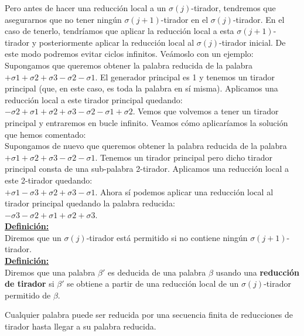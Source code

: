 \documentclass[14pt]{extarticle}
\begin{document}
Pero antes de hacer una reducción local a un $\sigma(j)$-tirador, tendremos que asegurarnos que no tener ningún $\sigma(j+1)$-tirador en el $\sigma(j)$-tirador. En el caso de tenerlo, tendríamos que aplicar la reducción local a esta $\sigma(j+1)$-tirador y posteriormente aplicar la reducción local al $\sigma(j)$-tirador inicial. De este modo podremos evitar ciclos infinitos. Veámoslo con un ejemplo:\\

Supongamos que queremos obtener la palabra reducida de la palabra $+\sigma1+\sigma2+\sigma3-\sigma2-\sigma1$. El generador principal es 1 y tenemos un tirador principal (que, en este caso, es toda la palabra en sí misma). Aplicamos una reducción local a este tirador principal quedando: \\
$-\sigma2+\sigma1+\sigma2+\sigma3-\sigma2-\sigma1+\sigma2$.
Vemos que volvemos a tener un tirador principal y entraremos en bucle infinito. Veamos cómo aplicaríamos la solución que hemos comentado:\\

Supongamos de nuevo que queremos obtener la palabra reducida de la palabra $+\sigma1+\sigma2+\sigma3-\sigma2-\sigma1$. Tenemos un tirador principal pero dicho tirador principal consta de una sub-palabra 2-tirador. Aplicamos una reducción local a este 2-tirador quedando:\\
$+\sigma1-\sigma3+\sigma2+\sigma3-\sigma1$. Ahora sí podemos aplicar una reducción local al tirador principal quedando la palabra reducida: \\
$-\sigma3-\sigma2+\sigma1+\sigma2+\sigma3$.\\

\underline{\textbf{Definición:}} \\
Diremos que un  $\sigma(j)$-tirador está permitido si no contiene ningún $\sigma(j+1)$-tirador.\\

\underline{\textbf{Definición:}} \\
Diremos que una palabra $\beta'$ es deducida de una palabra $\beta$ usando una \textbf{reducción de tirador} si $\beta'$ se obtiene a partir de una reducción local de un $\sigma(j)$-tirador permitido de $\beta$.\\

\begin{teo}
	Cualquier palabra puede ser reducida por una secuencia finita de reducciones de tirador hasta llegar a su palabra reducida.
\end{teo}
\end{document}
